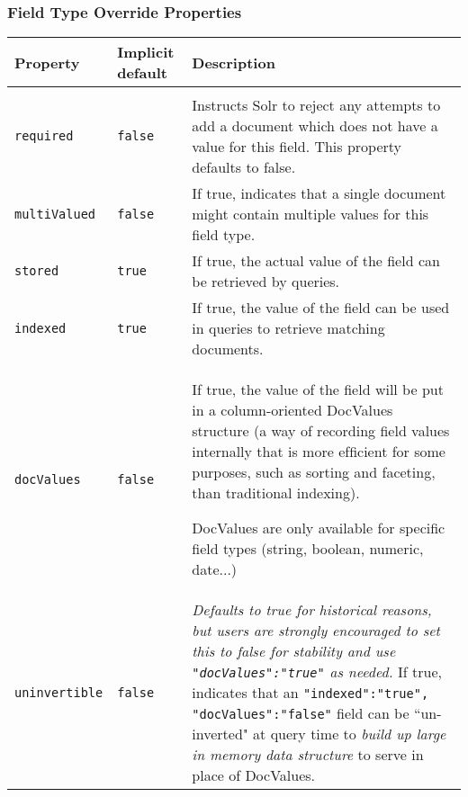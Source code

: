 \bigskip




\subsubsection*{Field Type Override Properties}


\begin{longtable}{| p{2.5cm} p{1.5cm} p{9cm} |}
	\hline
	Property
	&
	Implicit default
	&
	Description
	\\
	\hline
	& & \\
	\endhead
	
	\hline
	\endfoot

	\texttt{required}
	&
	\texttt{false}
	&
	Instructs Solr to reject any attempts to add a document which
	does not have a value for this ﬁeld. This property defaults to
	false. \newline
	\\
	
	
	\texttt{multiValued}
	&
	\texttt{false}
	&
	If true, indicates that a single document might contain multiple
	values for this ﬁeld type. \newline
	\\
	
	
	\texttt{stored}
	&
	\texttt{true}
	&
	If true, the actual value of the ﬁeld can be retrieved by queries. \newline
	\\
	
	\texttt{indexed}
	&
	\texttt{true}
	&
	If true, the value of the ﬁeld can be used in queries to retrieve
	matching documents. \newline
	\\
	
	
	\texttt{docValues}
	&
	\texttt{false}
	&
	If true, the value of the ﬁeld will be put in a column-oriented DocValues structure (a way of recording ﬁeld values internally that is more efﬁcient for some purposes, such as sorting and faceting, than traditional indexing). \newline
	
	DocValues are only available for speciﬁc ﬁeld types (string, boolean, numeric, date...) \newline
	\\
	
	
	\texttt{uninvertible}
	&
	\texttt{false}
	&
	\emph{Defaults to true for historical reasons, but users are strongly encouraged to set this to false for stability and use
	\texttt{"docValues":"true"} as needed.} \newline
	\newline
	If true, indicates that an \newline
	\texttt{"indexed":"true", "docValues":"false"} field can be \newline ``un-inverted" at query time to \emph{build up large in memory data structure} to serve in place of DocValues. \newline
	\\
	

\end{longtable}

